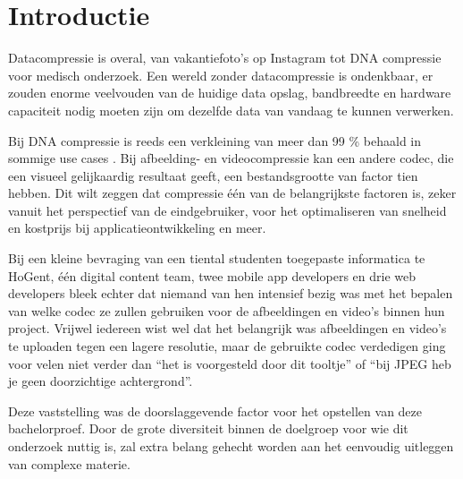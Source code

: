 
\section{Introductie} %
\label{sec:introductie}

Datacompressie is overal, van vakantiefoto's op Instagram tot DNA compressie voor medisch onderzoek. Een wereld zonder datacompressie is ondenkbaar, er zouden enorme veelvouden van de huidige data opslag, bandbreedte en hardware capaciteit nodig moeten zijn om dezelfde data van vandaag te kunnen verwerken.

Bij DNA compressie is reeds een verkleining van meer dan 99 \% behaald in sommige use cases \autocite{Afify2011}. Bij afbeelding- en videocompressie kan een andere codec, die een visueel gelijkaardig resultaat geeft, een bestandsgrootte van factor tien hebben. Dit wilt zeggen dat compressie één van de belangrijkste factoren is, zeker vanuit het perspectief van de eindgebruiker, voor het optimaliseren van snelheid en kostprijs bij applicatieontwikkeling en meer.

Bij een kleine bevraging van een tiental studenten toegepaste informatica te HoGent, één digital content team, twee mobile app developers en drie web developers bleek echter dat niemand van hen intensief bezig was met het bepalen van welke codec ze zullen gebruiken voor de afbeeldingen en video’s binnen hun project. Vrijwel iedereen wist wel dat het belangrijk was afbeeldingen en video’s te uploaden tegen een lagere resolutie, maar de gebruikte codec verdedigen ging voor velen niet verder dan “het is voorgesteld door dit tooltje” of “bij JPEG heb je geen doorzichtige achtergrond”. 

Deze vaststelling was de doorslaggevende factor voor het opstellen van deze bachelorproef. Door de grote diversiteit binnen de doelgroep voor wie dit onderzoek nuttig is, zal extra belang gehecht worden aan het eenvoudig uitleggen van complexe materie.

